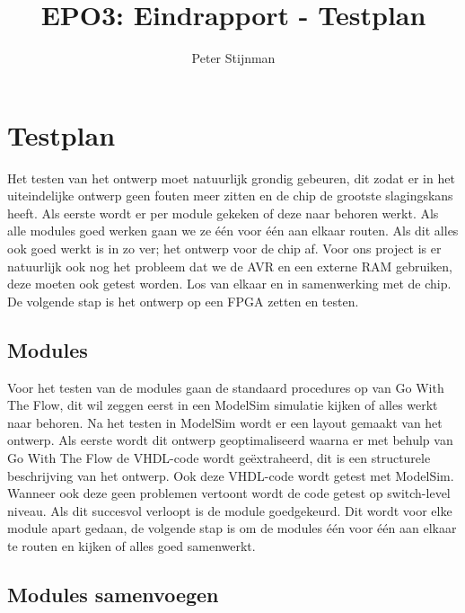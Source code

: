 \documentclass{scrartcl} %
\author{Peter Stijnman}
\title{EPO3: Eindrapport - Testplan}
\begin{document}
\chapter{Testplan}
\label{ch:testplan}


Het testen van het ontwerp moet natuurlijk grondig gebeuren, dit zodat er in het uiteindelijke ontwerp geen fouten meer zitten en de chip de grootste slagingskans heeft. 
Als eerste wordt er per module gekeken of deze naar behoren werkt. Als alle modules goed werken gaan we ze één voor één aan elkaar routen. Als dit alles ook goed werkt is in zo ver; het ontwerp voor de chip af.
Voor ons project is er natuurlijk ook nog het probleem dat we de AVR en een externe RAM gebruiken, deze moeten ook getest worden. Los van elkaar en in samenwerking met de chip.
De volgende stap is  het ontwerp op een FPGA zetten en testen.

\section{Modules}

Voor het testen van de modules gaan de standaard procedures op van Go With The Flow, dit wil zeggen eerst in een ModelSim simulatie kijken of alles werkt naar behoren. 
Na het testen in ModelSim wordt er een layout gemaakt van het ontwerp. Als eerste wordt dit ontwerp geoptimaliseerd waarna er met behulp van Go With The Flow de VHDL-code wordt geëxtraheerd, dit is een structurele beschrijving van het ontwerp. Ook deze VHDL-code wordt getest met ModelSim. Wanneer ook deze geen problemen vertoont wordt de code getest op switch-level niveau. Als dit succesvol verloopt is de module goedgekeurd.
Dit wordt voor elke module apart gedaan, de volgende stap is om de modules één voor één aan elkaar te routen en kijken of alles goed samenwerkt.



\section{Modules samenvoegen}
\end{document}
